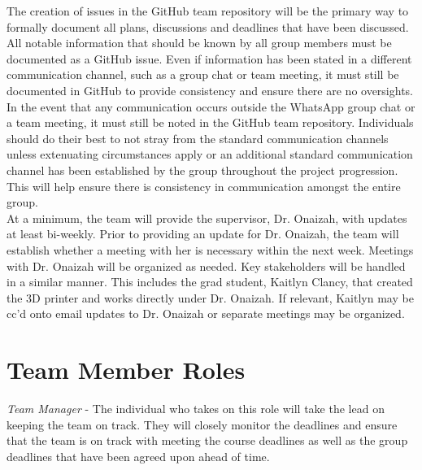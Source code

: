 \documentclass{article}
\begin{document}
The creation of issues in the GitHub team repository will be the primary way to formally document all plans,
discussions and deadlines that have been discussed. All notable information that should be known by all group
members must be documented as a GitHub issue. Even if information has been stated in a different communication channel,
such as a group chat or team meeting, it must still be documented in GitHub to provide consistency and ensure there
are no oversights.\\

In the event that any communication occurs outside the WhatsApp group chat or a team meeting, it must still be
noted in the GitHub team repository. Individuals should do their best to not stray from the standard communication
channels unless extenuating circumstances apply or an additional standard communication channel has been established
by the group throughout the project progression. This will help ensure there is consistency in communication amongst
the entire group.\\

At a minimum, the team will provide the supervisor, Dr. Onaizah, with updates at least bi-weekly. Prior to providing
an update for Dr. Onaizah, the team will establish whether a meeting with her is necessary within the next week.
Meetings with Dr. Onaizah will be organized as needed. Key stakeholders will be handled in a similar manner. This
includes the grad student, Kaitlyn Clancy, that created the 3D printer and works directly under Dr. Onaizah. If relevant, Kaitlyn 
may be cc’d onto email updates to Dr. Onaizah or separate meetings may be organized.

\section{Team Member Roles}

\iffalse
\wss{You should identify the types of roles you anticipate, like notetaker,
leader, meeting chair, reviewer.  Assigning specific people to those roles is
not necessary at this stage.  In a student team the role of the individuals will
likely change throughout the year.}
\fi

\textit{Team Manager} - The individual who takes on this role will take the lead on keeping the team on track. They
will closely monitor the deadlines and ensure that the team is on track with meeting the course deadlines as well as
the group deadlines that have been agreed upon ahead of time.\\
\end{document}
